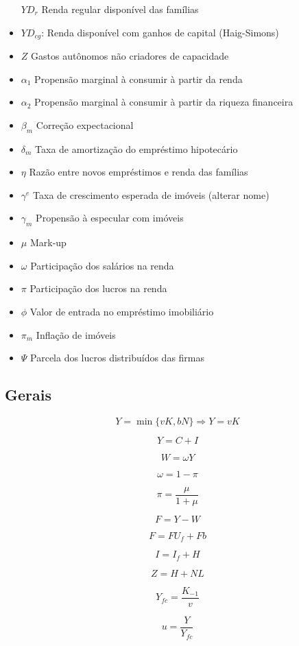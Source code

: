 \documentclass[11pt]{article}
\begin{document}
\begin{itemize}
  \(YD_r\) Renda regular disponível das famílias
\item
  \(YD_{cg}\): Renda disponível com ganhos de capital (Haig-Simons)
\item
  \(Z\) Gastos autônomos não criadores de capacidade
\item
  \(\alpha_1\) Propensão marginal à consumir à partir da renda
\item
  \(\alpha_2\) Propensão marginal à consumir à partir da riqueza
  financeira
\item
  \(\beta_m\) Correção expectacional
\item
  \(\delta_m\) Taxa de amortização do empréstimo hipotecário
\item
  \(\eta\) Razão entre novos empréstimos e renda das famílias
\item
  \(\gamma^e\) Taxa de crescimento esperada de imóveis (alterar nome)
\item
  \(\gamma_m\) Propensão à especular com imóveis
\item
  \(\mu\) Mark-up
\item
  \(\omega\) Participação dos salários na renda
\item
  \(\pi\) Participação dos lucros na renda
\item
  \(\phi\) Valor de entrada no empréstimo imobiliário
\item
  \(\pi_m\) Inflação de imóveis
\item
  \(\Psi\) Parcela dos lucros distribuídos das firmas
\end{itemize}

    \hypertarget{gerais}{%
\subsection{Gerais}\label{gerais}}

\[
Y = \min \{vK, bN\} \Rightarrow Y = vK
\]

\[
Y = C + I
\]

\[
W = \omega Y
\]

\[
\omega = 1-\pi
\]

\[
\pi = \frac{\mu}{1+\mu}
\]

\[
F = Y - W
\]

\[
F = FU_f + Fb 
\]

\[
I = I_f + H
\]

\[
Z = H + NL
\]

\[
Y_{fc} = \frac{K_{-1}}{v}
\]

\[
u = \frac{Y}{Y_{fc}}
\]
\end{document}
